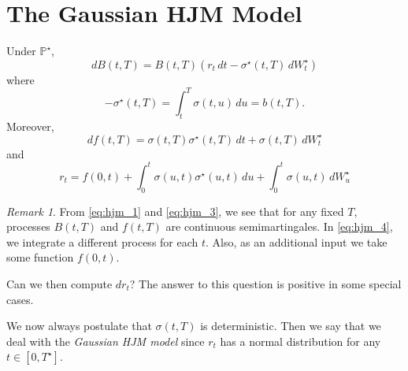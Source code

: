 \documentclass[10pt, oneside, reqno]{amsbook}
\theoremstyle{plain}%
\theoremstyle{definition}
\theoremstyle{remark}
\newtheorem*{rem}{Remark}
\renewcommand{\P}{\mathbb{P}}
\numberwithin{equation}{chapter}
\begin{document}

\section{The Gaussian HJM Model} %
\label{sec:examples_of_hjm_models}
Under $\P^\star$, \begin{equation}
	\label{eq:hjm_1}
	dB(t, T) = B(t, T) \left(r_t \, dt - \sigma^\star(t, T) \, dW^\star_t \right)
\end{equation} where \begin{equation}
	\label{eq:hjm_2}
	-\sigma^\star(t, T) = \int_t^T \sigma(t, u) \, du = b(t, T).
\end{equation}  Moreover, \begin{equation}
	\label{eq:hjm_3}
	df(t, T) = \sigma(t, T) \sigma^\star(t, T) \, dt  + \sigma(t, T) \, dW^\star_t
\end{equation} and \begin{equation}
	\label{eq:hjm_4}
	r_t = f(0, t) + \int_0^t \sigma(u, t) \sigma^\star(u, t) \, du + \int_0^t \sigma(u, t) \, dW^\star_u
\end{equation} 

\begin{rem}
	From \eqref{eq:hjm_1} and \eqref{eq:hjm_3}, we see that for any fixed $T$, processes $B(t, T)$ and $f(t, T)$ are continuous semimartingales.  In \eqref{eq:hjm_4}, we integrate a different process for each $t$.  Also, as an additional input we take some function $f(0, t)$.
	
	Can we then compute $dr_t$?  The answer to this question is positive in some special cases.
\end{rem}

We now always postulate that $\sigma(t, T)$ is deterministic.  Then we say that we deal with the \emph{Gaussian HJM model} since $r_t$ has a normal distribution for any $t \in [0, T^\star]$.  
\end{document}
